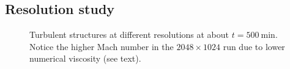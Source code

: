 \subsection{Resolution study}

\begin{figure}[t!]
  \centering
  \centering
      \hfill
    \caption{Turbulent structures at different resolutions at about $t=500 \ \mathrm{min}$. Notice the higher Mach number in the $2048 \times 1024$ run due to lower numerical viscosity (see text).}
    \label{fig:differentialmach}
 \end{figure}


